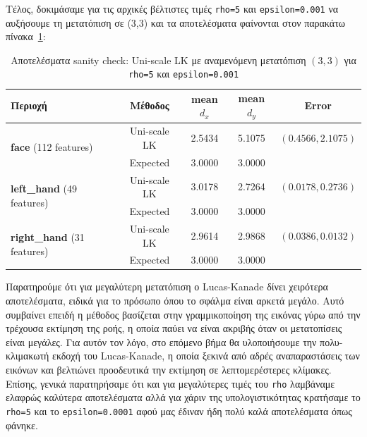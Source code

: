 \documentclass[12pt, a4paper]{article}
\begin{document}
Τέλος, δοκιμάσαμε για τις αρχικές βέλτιστες τιμές \texttt{rho=5} και \texttt{epsilon=0.001} να αυξήσουμε τη μετατόπιση σε (3,3) και τα αποτελέσματα φαίνονται στον παρακάτω πίνακα~\ref{table:sanity_check_5}:
\begin{table}[H]
\centering
\setlength{\tabcolsep}{6pt}
\begin{tabular}{lcccc}
\toprule
\textbf{Περιοχή} & \textbf{Μέθοδος} & \textbf{mean $d_x$} & \textbf{mean $d_y$} & \textbf{Error} \\
\midrule
\multirow{2}{*}{\textbf{face} (112 features)} & Uni-scale LK & 2.5434 & 5.1075 & $(0.4566, 2.1075)$ \\
 & Expected & 3.0000 & 3.0000 & \\
\midrule
\multirow{2}{*}{\textbf{left\_hand} (49 features)} & Uni-scale LK & 3.0178 & 2.7264 & $(0.0178, 0.2736)$ \\
 & Expected & 3.0000 & 3.0000 & \\
\midrule
\multirow{2}{*}{\textbf{right\_hand} (31 features)} & Uni-scale LK & 2.9614 & 2.9868 & $(0.0386, 0.0132)$ \\
 & Expected & 3.0000 & 3.0000 & \\
\bottomrule
\end{tabular}
\caption{Αποτελέσματα sanity check: Uni-scale LK με αναμενόμενη μετατόπιση $(3, 3)$ για \texttt{rho=5} και \texttt{epsilon=0.001}}
\label{table:sanity_check_5}
\end{table}

Παρατηρούμε ότι για μεγαλύτερη μετατόπιση ο Lucas-Kanade δίνει χειρότερα αποτελέσματα, ειδικά για το πρόσωπο όπου το σφάλμα είναι αρκετά μεγάλο. Αυτό συμβαίνει επειδή η μέθοδος βασίζεται στην γραμμικοποίηση της εικόνας γύρω από την τρέχουσα εκτίμηση της ροής, η οποία παύει να είναι ακριβής όταν οι μετατοπίσεις είναι μεγάλες. Για αυτόν τον λόγο, στο επόμενο βήμα θα υλοποιήσουμε την πολυ-κλιμακωτή εκδοχή του Lucas-Kanade, η οποία ξεκινά από αδρές αναπαραστάσεις των εικόνων και βελτιώνει προοδευτικά την εκτίμηση σε λεπτομερέστερες κλίμακες.
Επίσης, γενικά παρατηρήσαμε ότι και για μεγαλύτερες τιμές του \texttt{rho} λαμβάναμε ελαφρώς καλύτερα αποτελέσματα αλλά για χάριν της υπολογιστικότητας κρατήσαμε το \texttt{rho=5} και το \texttt{epsilon=0.0001} αφού μας έδιναν ήδη πολύ καλά αποτελέσματα όπως φάνηκε.\\
\end{document}
